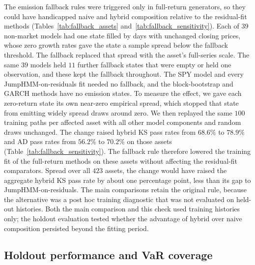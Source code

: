 The emission fallback rules were triggered only in full-return
generators, so they could have handicapped naive and hybrid
composition relative to the residual-fit methods
(Tables~\ref{tab:fallback_assets} and~\ref{tab:fallback_sensitivity}).
Each of $39$ non-market models had one state filled by days with
unchanged closing prices, whose zero growth rates gave the state a sample spread below the fallback threshold. The
fallback replaced that spread with the asset's full-series scale. The same $39$ models held
$11$ further fallback states that were empty or held one observation,
and these kept the fallback throughout. The SPY model and every
JumpHMM-on-residuals fit needed no fallback, and the block-bootstrap
and GARCH methods have no emission states. To measure the effect, we gave each zero-return state its own near-zero empirical spread,
which stopped that state from emitting widely spread draws around
zero. We then replayed
the same $100$ training paths per affected asset with all other model
components and random draws unchanged. The change raised hybrid KS
pass rates from $68.6\%$ to $78.9\%$ and AD pass rates from $56.2\%$
to $70.2\%$ on those assets (Table~\ref{tab:fallback_sensitivity}).
The fallback rule therefore lowered the training fit of the
full-return methods on these assets without affecting the residual-fit
comparators. Spread over all $423$ assets, the change would have
raised the aggregate hybrid KS pass rate by about one percentage
point, less than its gap to JumpHMM-on-residuals. The main comparisons
retain the original rule, because the alternative was a post hoc
training diagnostic that was not evaluated on held-out histories. Both the main comparison and this check used training
histories only; the holdout evaluation tested whether the advantage of
hybrid over naive composition persisted beyond the fitting period.

\subsection{Holdout performance and VaR coverage}

